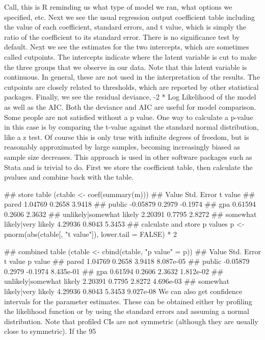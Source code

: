 \documentclass[00-GLMregression.tex]{subfiles}
\begin{document}
Call, this is R reminding us what type of model we ran, what options we specified, etc.
Next we see the usual regression output coefficient table including the value of each coefficient, standard errors, and t value, which is simply the ratio of the coefficient to its standard error. There is no significance test by default.
Next we see the estimates for the two intercepts, which are sometimes called cutpoints. The intercepts indicate where the latent variable is cut to make the three groups that we observe in our data. Note that this latent variable is continuous. In general, these are not used in the interpretation of the results. The cutpoints are closely related to thresholds, which are reported by other statistical packages.
Finally, we see the residual deviance, -2 * Log Likelihood of the model as well as the AIC. Both the deviance and AIC are useful for model comparison.
Some people are not satisfied without a p value. One way to calculate a p-value in this case is by comparing the t-value against the standard normal distribution, like a z test. Of course this is only true with infinite degrees of freedom, but is reasonably approximated by large samples, becoming increasingly biased as sample size decreases. This approach is used in other software packages such as Stata and is trivial to do. First we store the coefficient table, then calculate the pvalues and combine back with the table.

## store table
(ctable <- coef(summary(m)))
##                                Value Std. Error t value
## pared                        1.04769     0.2658  3.9418
## public                      -0.05879     0.2979 -0.1974
## gpa                          0.61594     0.2606  2.3632
## unlikely|somewhat likely     2.20391     0.7795  2.8272
## somewhat likely|very likely  4.29936     0.8043  5.3453
## calculate and store p values
p <- pnorm(abs(ctable[, "t value"]), lower.tail = FALSE) * 2

## combined table
(ctable <- cbind(ctable, "p value" = p))
##                                Value Std. Error t value   p value
## pared                        1.04769     0.2658  3.9418 8.087e-05
## public                      -0.05879     0.2979 -0.1974 8.435e-01
## gpa                          0.61594     0.2606  2.3632 1.812e-02
## unlikely|somewhat likely     2.20391     0.7795  2.8272 4.696e-03
## somewhat likely|very likely  4.29936     0.8043  5.3453 9.027e-08
We can also get confidence intervals for the parameter estimates. These can be obtained either by profiling the likelihood function or by using the standard errors and assuming a normal distribution. Note that profiled CIs are not symmetric (although they are usually close to symmetric). If the 95%
\end{document}
